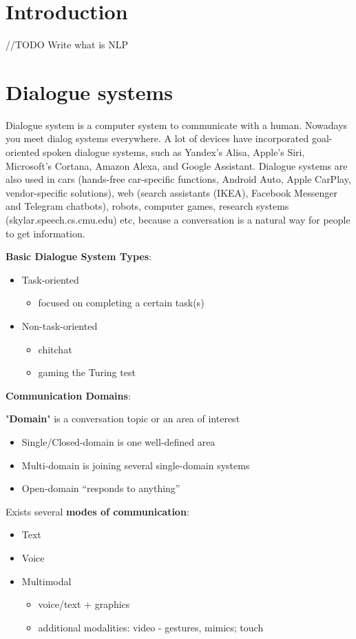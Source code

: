 \chapter{Introduction}\label{introduction}
//TODO Write what is NLP

\chapter{Dialogue systems}\label{dialogue systems}
Dialogue system is a computer system to communicate with a human. Nowadays you meet dialog systems everywhere. A lot of devices have incorporated goal-oriented spoken dialogue systems, such as  Yandex’s Alisa,  Apple’s Siri, Microsoft’s Cortana, Amazon Alexa, and Google Assistant. Dialogue systems are also used in cars (hands-free car-specific functions, Android Auto, Apple CarPlay, vendor-specific solutions), web (search assistants (IKEA), Facebook Messenger and Telegram chatbots), robots, computer games, research systems (skylar.speech.cs.cmu.edu) etc, because a conversation is a natural way for people to get information.

\textbf{Basic Dialogue System Types}:
\begin{itemize}
  \item Task-oriented 
    \begin{itemize}
      \item focused on completing a certain task(s)
    \end{itemize}
  \item Non-task-oriented
    \begin{itemize}
      \item chitchat
      \item gaming the Turing test
    \end{itemize}    
\end{itemize}

\textbf{Communication Domains}:

"\textbf{Domain}" is a conversation topic or an area of interest
\begin{itemize}
  \item Single/Closed-domain is one well-defined area
  \item Multi-domain is joining several single-domain systems
  \item Open-domain “responds to anything”
\end{itemize}


Exists several \textbf{modes of communication}:
\begin{itemize}
  \item Text
  \item Voice
  \item Multimodal
    \begin{itemize}
      \item voice/text + graphics
      \item additional modalities: video - gestures, mimics; touch
    \end{itemize}
\end{itemize}

